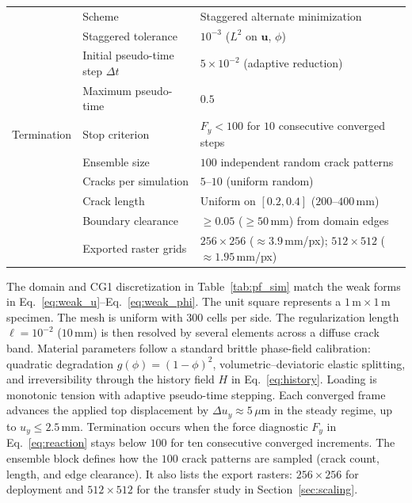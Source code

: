 \documentclass[10pt]{article}
\theoremstyle{definition}
\begin{document}
\begin{table}[ht]
\begin{tabular}{lll}
        \midrule
          & Scheme & Staggered alternate minimization \\
          & Staggered tolerance & $10^{-3}$ ($L^2$ on $\mathbf{u}$, $\phi$) \\
          & Initial pseudo-time step $\Delta t$ & $5\times10^{-2}$ (adaptive reduction) \\
          & Maximum pseudo-time & $0.5$ \\
        \midrule
        Termination
          & Stop criterion & $F_y<100$ for $10$ consecutive converged steps \\
        \midrule
          & Ensemble size & $100$ independent random crack patterns \\
          & Cracks per simulation & $5$--$10$ (uniform random) \\
          & Crack length & Uniform on $[0.2,0.4]$ ($200$--$400\,\mathrm{mm}$) \\
          & Boundary clearance & $\ge 0.05$ ($\ge 50\,\mathrm{mm}$) from domain edges \\
          & Exported raster grids & $256\times256$ ($\approx 3.9\,\mathrm{mm}$/px); $512\times512$ ($\approx 1.95\,\mathrm{mm}$/px) \\
        \bottomrule
    \end{tabular}
\end{table}

The domain and CG1 discretization in Table~\ref{tab:pf_sim} match the weak forms in Eq.~\eqref{eq:weak_u}--Eq.~\eqref{eq:weak_phi}.
%
The unit square represents a $1\,\mathrm{m}\times1\,\mathrm{m}$ specimen.
%
The mesh is uniform with $300$ cells per side.
%
The regularization length $\ell=10^{-2}$ ($10\,\mathrm{mm}$) is then resolved by several elements across a diffuse crack band.
%
Material parameters follow a standard brittle phase-field calibration: quadratic degradation $g(\phi)=(1-\phi)^2$, volumetric--deviatoric elastic splitting, and irreversibility through the history field $H$ in Eq.~\eqref{eq:history}.
%
Loading is monotonic tension with adaptive pseudo-time stepping.
%
Each converged frame advances the applied top displacement by $\Delta u_y\approx5\,\mu\mathrm{m}$ in the steady regime, up to $u_y\le2.5\,\mathrm{mm}$.
%
Termination occurs when the force diagnostic $F_y$ in Eq.~\eqref{eq:reaction} stays below $100$ for ten consecutive converged increments.
%
The ensemble block defines how the $100$ crack patterns are sampled (crack count, length, and edge clearance).
%
It also lists the export rasters: $256\times256$ for deployment and $512\times512$ for the transfer study in Section~\ref{sec:scaling}.
\end{document}

